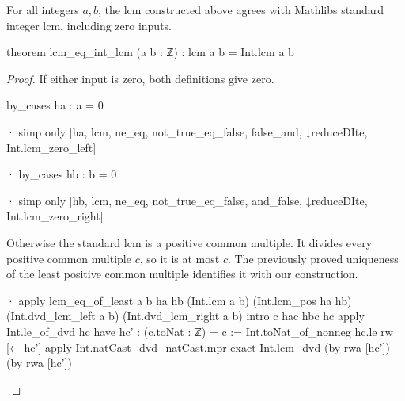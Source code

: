 \begin{lemma} \label{nt:lem:lcm-eq-int-lcm}
  For all integers $a,b$, the lcm constructed above agrees with Mathlib\textquotesingle s standard integer lcm, including zero inputs.

  \begin{lean}
    theorem lcm_eq_int_lcm (a b : ℤ) : lcm a b = Int.lcm a b
  \end{lean}
\end{lemma}

\begin{proof}
  If either input is zero, both definitions give zero.

  \begin{lean}
    by_cases ha : a = 0

    · simp only [ha, lcm, ne_eq, not_true_eq_false, false_and, ↓reduceDIte,
        Int.lcm_zero_left]

    · by_cases hb : b = 0

      · simp only [hb, lcm, ne_eq, not_true_eq_false, and_false, ↓reduceDIte,
          Int.lcm_zero_right]
  \end{lean}

  Otherwise the standard lcm is a positive common multiple. It divides every positive common multiple $c$, so it is at most $c$. The previously proved uniqueness of the least positive common multiple identifies it with our construction.

  \begin{lean}
    · apply lcm_eq_of_least a b ha hb (Int.lcm a b)
        (Int.lcm_pos ha hb) (Int.dvd_lcm_left a b) (Int.dvd_lcm_right a b)
      intro c hac hbc hc
      apply Int.le_of_dvd hc
      have hc' : (c.toNat : ℤ) = c := Int.toNat_of_nonneg hc.le
      rw [← hc']
      apply Int.natCast_dvd_natCast.mpr
      exact Int.lcm_dvd (by rwa [hc']) (by rwa [hc'])
  \end{lean}

\end{proof}
